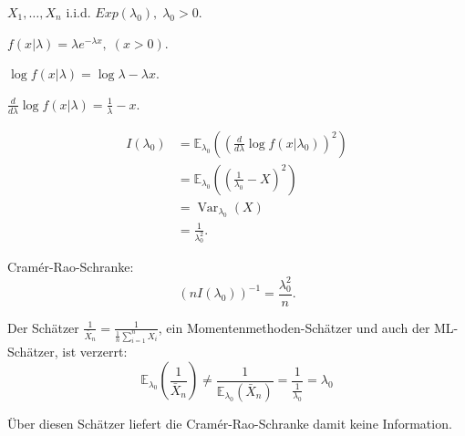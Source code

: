 \documentclass{tstextbook}
\DeclareMathOperator{\Var}{Var}
\newcommand{\E}{\mathbb E}
\begin{document}
\begin{example}[Exponentialverteilung]
	$ X_1,\ldots,X_n $ i.i.d. $ Exp(\lambda_0), \; \lambda_0 > 0 $. 
	
	$ f(x|\lambda) = \lambda e^{-\lambda x}, \; (x > 0) $. 
	
	$ \log f(x|\lambda) = \log \lambda - \lambda x $. 
	
	$ \frac{d}{d\lambda} \log f(x|\lambda) = \frac{1}{\lambda} - x $. 
	
	\[
	\begin{aligned}
		I(\lambda_0) & = \E_{\lambda_0} \left(\left(\frac{d}{d\lambda}\log f(x|\lambda_0)\right)^2\right) \\
		& = \E_{\lambda_0} \left(\left(\frac{1}{\lambda_0}-X\right)^2\right) \\
		& = \Var_{\lambda_0}(X) \\
		& = \frac{1}{\lambda_0^2}.
	\end{aligned}
	\]
	
	Cramér-Rao-Schranke: 
	\[
	\left(nI(\lambda_0)\right)^{-1} = \frac{\lambda_0^2}{n}.
	\]
	
	Der Schätzer $ \frac{1}{\bar{X}_n} = \frac{1}{\frac{1}{n}\sum_{i=1}^{n}X_i} $, ein Momentenmethoden-Schätzer und auch der ML-Schätzer, ist verzerrt: 
	\[
	\E_{\lambda_0}\left(\frac{1}{\bar{X}_n}\right) \ne \frac{1}{\E_{\lambda_0}(\bar{X}_n)} = \frac{1}{\frac{1}{\lambda_0}}= \lambda_0 
	\]
	
	Über diesen Schätzer liefert die Cramér-Rao-Schranke damit keine Information.
\end{example}
\end{document}
